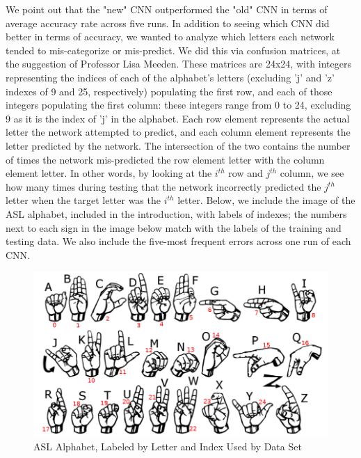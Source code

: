 \documentclass[11pt]{article}
\begin{document}
We point out that the "new" CNN outperformed the "old" CNN in terms of average accuracy rate across five runs. In addition to seeing which CNN did better in terms of accuracy, we wanted to analyze which letters each network tended to mis-categorize or mis-predict. We did this via confusion matrices, at the suggestion of Professor Lisa Meeden. These matrices are 24x24, with integers representing the indices of each of the alphabet's letters (excluding 'j' and 'z' indexes of 9 and 25, respectively) populating the first row, and each of those integers populating the first column: these integers range from 0 to 24, excluding 9 as it is the index of 'j' in the alphabet. Each row element represents the actual letter the network attempted to predict, and each column element represents the letter predicted by the network. The intersection of the two contains the number of times the network mis-predicted the row element letter with the column element letter. In other words, by looking at the $i^{th}$ row and $j^{th}$ column, we see how many times during testing that the network incorrectly predicted the $j^{th}$ letter when the target letter was the $i^{th}$ letter. Below, we include the image of the ASL alphabet, included in the introduction, with labels of indexes; the numbers next to each sign in the image below match with the labels of the training and testing data. We also include the five-most frequent errors across one run of each CNN.

\begin{figure}[H]
\begin{center}
\includegraphics[scale=0.6]{images/Labeled_ASL_Alphabet.png}
\caption{ASL Alphabet, Labeled by Letter and Index Used by Data Set}
\end{center}
\end{figure}
\end{document}
